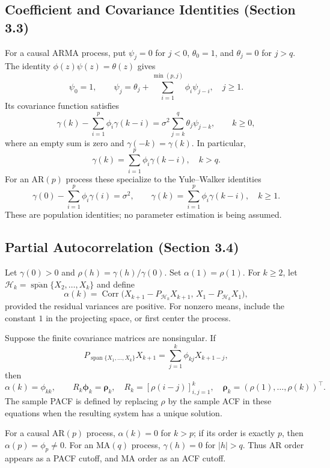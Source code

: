 \subsection{Coefficient and Covariance Identities (Section 3.3)}
For a causal ARMA process, put $\psi_j=0$ for $j<0$,
$\theta_0=1$, and $\theta_j=0$ for $j>q$. The identity
$\phi(z)\psi(z)=\theta(z)$ gives
\[
\psi_0=1,\qquad
\psi_j=\theta_j+\sum_{i=1}^{\min(p,j)}\phi_i\psi_{j-i},\quad j\ge1.
\]
Its covariance function satisfies
\[
\gamma(k)-\sum_{i=1}^{p}\phi_i\gamma(k-i)
=\sigma^2\sum_{j=k}^{q}\theta_j\psi_{j-k},\qquad k\ge0,
\]
where an empty sum is zero and $\gamma(-k)=\gamma(k)$. In particular,
\[
\gamma(k)=\sum_{i=1}^{p}\phi_i\gamma(k-i),\quad k>q.
\]
For an AR$(p)$ process these specialize to the Yule--Walker identities
\[
\gamma(0)-\sum_{i=1}^{p}\phi_i\gamma(i)=\sigma^2,\qquad
\gamma(k)=\sum_{i=1}^{p}\phi_i\gamma(k-i),\quad k\ge1.
\]
These are population identities; no parameter estimation is being assumed.

\subsection{Partial Autocorrelation (Section 3.4)}
\begin{definition}
Let $\gamma(0)>0$ and $\rho(h)=\gamma(h)/\gamma(0)$.
Set $\alpha(1)=\rho(1)$. For $k\ge2$, let
$\mathcal H_k=\overline{\operatorname{span}}\{X_2,\ldots,X_k\}$ and define
\[
\alpha(k)=\operatorname{Corr}\bigl(
X_{k+1}-P_{\mathcal H_k}X_{k+1},\,
X_1-P_{\mathcal H_k}X_1\bigr),
\]
provided the residual variances are positive. For nonzero means, include the
constant $1$ in the projecting space, or first center the process.
\end{definition}
\begin{proposition}
Suppose the finite covariance matrices are nonsingular. If
\[
P_{\operatorname{span}\{X_1,\ldots,X_k\}}X_{k+1}
=\sum_{j=1}^{k}\phi_{kj}X_{k+1-j},
\]
then
\[
\alpha(k)=\phi_{kk},\qquad
R_k\boldsymbol\phi_k=\boldsymbol\rho_k,
\quad R_k=[\rho(i-j)]_{i,j=1}^k,
\quad\boldsymbol\rho_k=(\rho(1),\ldots,\rho(k))^\top.
\]
The sample PACF is defined by replacing $\rho$ by the sample ACF in these
equations when the resulting system has a unique solution.
\end{proposition}
\begin{proposition}
For a causal AR$(p)$ process, $\alpha(k)=0$ for $k>p$; if its order is
exactly $p$, then $\alpha(p)=\phi_p\ne0$.
For an MA$(q)$ process, $\gamma(h)=0$ for $|h|>q$.
Thus AR order appears as a PACF cutoff, and MA order as an ACF cutoff.
\end{proposition}

